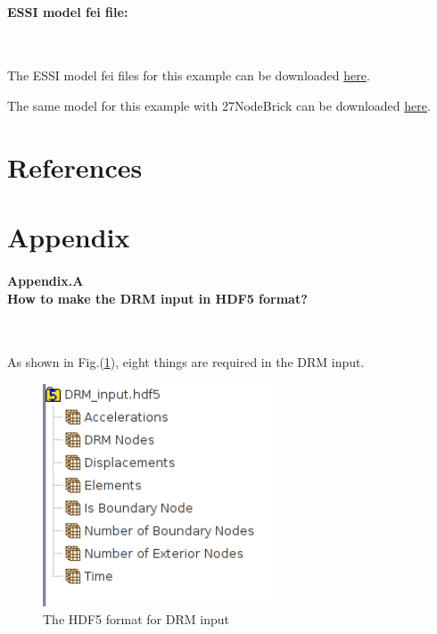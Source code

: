 \documentclass[fleqn,11pt]{article}
\begin{document}
\paragraph{ESSI model fei file: } ~



The ESSI model fei files for this example can be downloaded \href{https://github.com/BorisJeremic/Real-ESSI-Examples/blob/master/model_fei_file/8NodeBrick_DRM_3D/8NodeBrick_DRM_3D.tgz?raw=true}{here}.

The same model for this example with 27NodeBrick can be downloaded \href{https://github.com/BorisJeremic/Real-ESSI-Examples/blob/master/model_fei_file/27NodeBrick_DRM_3D/27NodeBrick_DRM_3D.tgz?raw=true}{here}.




\newpage
\section{References}
\nocite{*}




\newpage
\section{Appendix}

\paragraph{Appendix.A \\
How to make the DRM input in HDF5 format?} ~


As shown in Fig.(\ref{fig The HDF5 format for DRM input}), eight things are required in the DRM input. 

\begin{figure}[H]
  \centering
  \includegraphics[width=7cm]{../Figure-files/DRM_input_format.png}
  \caption{The HDF5 format for DRM input}
  \label{fig The HDF5 format for DRM input}
\end{figure}
\end{document}
